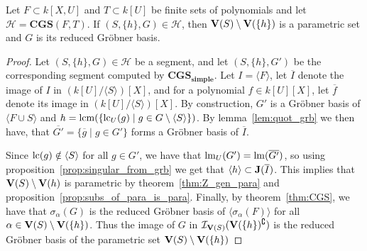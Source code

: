 \begin{theorem}\label{thm:segs_are_para}
  Let $F \subset k[X, U]$ and $T \subset k[U]$ be finite sets of polynomials and let $\mathcal H = \mathbf{CGS}(F, T)$. If $(S, \{h\}, G) \in \mathcal H$, then $\operatorname{\mathbf V}(S) \setminus \operatorname{\mathbf V}(\{h\})$ is a parametric set and $G$ is its reduced Gröbner basis.
\end{theorem}
\begin{proof}
  Let $(S, \{h\}, G) \in \mathcal H$ be a segment, and let $(S, \{h\}, G')$ be the corresponding segment computed by $\mathbf{CGS_{simple}}$. Let $I = \langle F \rangle$, let $\overline I$ denote the image of $I$ in $(k[U]/\langle S \rangle)[X]$, and for a polynomial $f \in k[U][X]$, let $\overline f$ denote its image in $(k[U]/\langle S \rangle)[X]$. By construction, $G'$ is a Gröbner basis of $\langle F \cup S \rangle$ and $h = \operatorname{lcm}(\{\operatorname{lc}_{U}(g) \mid g \in G \setminus \langle S \rangle\})$. By lemma~\ref{lem:quot_grb} we then have, that $\overline{G'} = \{\overline g \mid g \in G'\}$ forms a Gröbner basis of $\overline I$.

  Since $\operatorname{lc}(g) \notin \langle S \rangle$ for all $g \in G'$, we have that $\operatorname{lm}_{U}(G') = \operatorname{lm}(\overline{G'})$, so using proposition~\ref{prop:singular_from_grb} we get that $\langle h \rangle \subset \operatorname{\mathbf J}(\overline I)$. This implies that $\operatorname{\mathbf V}(S) \setminus \operatorname{\mathbf V}(h)$ is parametric by theorem~\ref{thm:Z_gen_para} and proposition~\ref{prop:subs_of_para_is_para}. Finally, by theorem~\ref{thm:CGS}, we have that $\sigma_{\alpha}(G)$ is the reduced Gröbner basis of $\langle \sigma_{\alpha}(F) \rangle$ for all $\alpha \in \operatorname{\mathbf V}(S) \setminus \operatorname{\mathbf V}(\{h\})$. Thus the image of $G$ in $\mathcal I_{\operatorname{\mathbf V}(S)}(\operatorname{\mathbf V}(\{h\})^{\complement})$ is the reduced Gröbner basis of the parametric set $\operatorname{\mathbf V}(S) \setminus \operatorname{\mathbf V}(\{h\})$
\end{proof}
